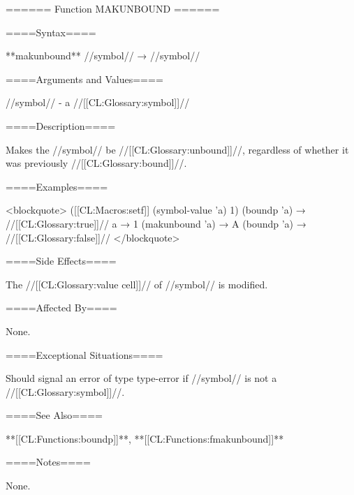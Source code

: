 ====== Function MAKUNBOUND ======

====Syntax====

**makunbound** //symbol// → //symbol//

====Arguments and Values====

//symbol// - a //[[CL:Glossary:symbol]]//

====Description====

Makes the //symbol// be //[[CL:Glossary:unbound]]//, regardless of whether it was previously //[[CL:Glossary:bound]]//.

====Examples====

<blockquote> ([[CL:Macros:setf]] (symbol-value 'a) 1) (boundp 'a) → //[[CL:Glossary:true]]// a → 1 (makunbound 'a) → A (boundp 'a) → //[[CL:Glossary:false]]// </blockquote>

====Side Effects====

The //[[CL:Glossary:value cell]]// of //symbol// is modified.

====Affected By====

None.

====Exceptional Situations====

Should signal an error of type type-error if //symbol// is not a //[[CL:Glossary:symbol]]//.

====See Also====

**[[CL:Functions:boundp]]**, **[[CL:Functions:fmakunbound]]**

====Notes====

None.


